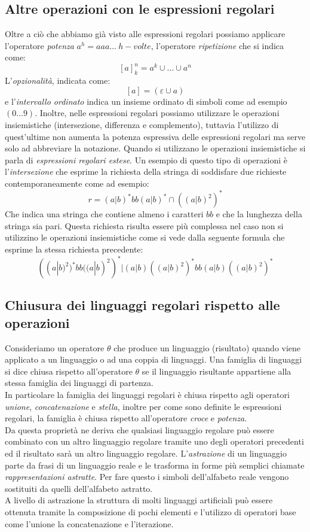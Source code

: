 \subsection{Altre operazioni con le espressioni regolari}
Oltre a ciò che abbiamo già visto alle espressioni regolari possiamo applicare l'operatore \emph{potenza} $a^h = aaa\dots \ h-volte$, l'operatore \emph{ripetizione} che si indica come:
$$[a]_k^n = a^k\cup \dots \cup a^n$$
L'\emph{opzionalità}, indicata come:
$$[a] = (\varepsilon \cup a)$$
e l'\emph{intervallo ordinato} indica un insieme ordinato di simboli come ad esempio $(0\dots 9)$.
Inoltre, nelle espressioni regolari possiamo utilizzare le operazioni insiemistiche (intersezione, differenza e complemento), tuttavia l'utilizzo di quest'ultime non aumenta la potenza espressiva delle espressioni regolari ma serve solo ad abbreviare la notazione. Quando si utilizzano le operazioni insiemistiche si parla di \emph{espressioni regolari estese}.
Un esempio di questo tipo di operazioni è l'\emph{intersezione} che esprime la richiesta della stringa di soddisfare due richieste contemporaneamente come ad esempio:
$$r = (a|b)^*bb(a|b)^*\cap ((a|b)^2)^*$$
Che indica una stringa che contiene almeno i caratteri $ bb $ e che la lunghezza della stringa sia pari. Questa richiesta risulta essere più complessa nel caso non si utilizzino le operazioni insiemistiche come si vede dalla seguente formula che esprime la stessa richiesta precedente:
$$((a|b)^2)^*bb((a|b)^2)^*|(a|b)((a|b)^2)^*bb(a|b)((a|b)^2)^*$$
\subsection{Chiusura dei linguaggi regolari rispetto alle operazioni}
Consideriamo un operatore $ \theta $ che produce un linguaggio (risultato) quando viene applicato a un linguaggio o ad una coppia di linguaggi. Una famiglia di linguaggi si dice chiusa rispetto all'operatore $ \theta $ se il linguaggio risultante appartiene alla stessa famiglia dei linguaggi di partenza.\\
In particolare la famiglia dei linguaggi regolari  è chiusa rispetto agli operatori \emph{unione}, \emph{concatenazione} e \emph{stella}, inoltre per come sono definite le espressioni regolari, la famiglia è chiusa rispetto all'operatore \emph{croce} e \emph{potenza}.\\
Da questa proprietà ne deriva che qualsiasi linguaggio regolare può essere combinato con un altro linguaggio regolare tramite uno degli operatori precedenti ed il risultato sarà un altro linguaggio regolare.
L'\emph{astrazione} di un linguaggio parte da frasi di un linguaggio reale e le trasforma in forme più semplici chiamate \emph{rappresentazioni astratte}. Per fare questo i simboli dell'alfabeto reale vengono sostituiti da quelli dell'alfabeto astratto.\\
A livello di astrazione la struttura di molti linguaggi artificiali può essere ottenuta tramite la composizione di pochi elementi e l'utilizzo di operatori base come l'unione la concatenazione e l'iterazione.
